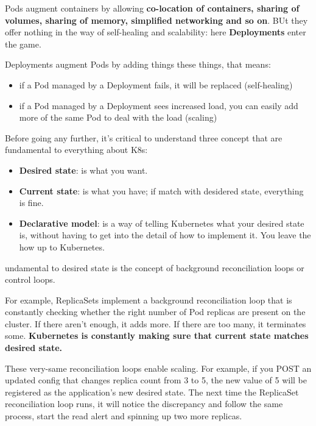 \documentclass[10pt,a4paper]{report}
\begin{document}
Pods augment containers by allowing \textbf{co-location of containers, sharing of volumes, sharing of memory, simplified networking and so on}. BUt they offer nothing in the way of self-healing and scalability: here \textbf{Deployments} enter the game. 

Deployments augment Pods by adding things these things, that means:
\begin{itemize}
	\item if a Pod managed by a Deployment fails, it will be replaced (self-healing)
	\item if a Pod managed by a Deployment sees increased load, you can easily add more of the same Pod to deal with the load (scaling)
\end{itemize}

Before going any further, it’s critical to understand three concept that are fundamental to everything about K8s:
\begin{itemize}
	\item \textbf{Desired state}: is what you want.
	\item \textbf{Current state}: is what you have; if match with desidered state, everything is fine.
	\item \textbf{Declarative model}: is a way of telling Kubernetes what your desired state is, without having to get into the detail of how to implement it. You leave the how up to Kubernetes.
\end{itemize}

undamental to desired state is the concept of background reconciliation loops or control loops. 

For example, ReplicaSets implement a background reconciliation loop that is constantly checking whether the right number of Pod replicas are present on the cluster. If there aren’t enough, it adds more. If there are too many, it terminates some. \textbf{Kubernetes is constantly making sure that current state matches desired state.}

These very-same reconciliation loops enable scaling. For example, if you POST an updated config that changes replica count from 3 to 5, the new value of 5 will be registered as the application’s new desired state. The next time the ReplicaSet reconciliation loop runs, it will
notice the discrepancy and follow the same process, start the read alert and spinning up two more replicas.
\end{document}
